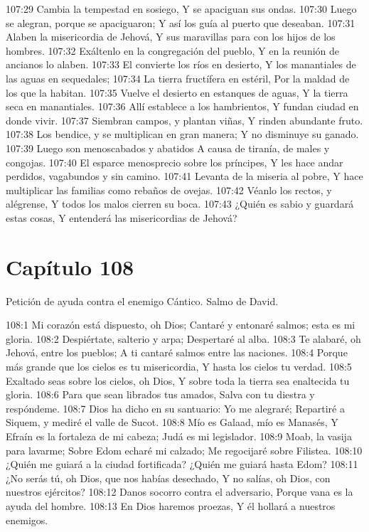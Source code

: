 107:29 Cambia la tempestad en sosiego, 
Y se apaciguan sus ondas. 
107:30 Luego se alegran, porque se apaciguaron; 
Y así los guía al puerto que deseaban. 
107:31 Alaben la misericordia de Jehová, 
Y sus maravillas para con los hijos de los hombres. 
107:32 Exáltenlo en la congregación del pueblo, 
Y en la reunión de ancianos lo alaben. 
107:33 El convierte los ríos en desierto, 
Y los manantiales de las aguas en sequedales; 
107:34 La tierra fructífera en estéril, 
Por la maldad de los que la habitan. 
107:35 Vuelve el desierto en estanques de aguas, 
Y la tierra seca en manantiales. 
107:36 Allí establece a los hambrientos, 
Y fundan ciudad en donde vivir. 
107:37 Siembran campos, y plantan viñas, 
Y rinden abundante fruto. 
107:38 Los bendice, y se multiplican en gran manera; 
Y no disminuye su ganado. 
107:39 Luego son menoscabados y abatidos 
A causa de tiranía, de males y congojas. 
107:40 El esparce menosprecio sobre los príncipes, 
Y les hace andar perdidos, vagabundos y sin camino. 
107:41 Levanta de la miseria al pobre, 
Y hace multiplicar las familias como rebaños de ovejas. 
107:42 Véanlo los rectos, y alégrense, 
Y todos los malos cierren su boca. 
107:43 ¿Quién es sabio y guardará estas cosas, 
Y entenderá las misericordias de Jehová? 
\section*{Capítulo 108}
Petición de ayuda contra el enemigo 
Cántico. Salmo de David. 
 
108:1 Mi corazón está dispuesto, oh Dios; 
Cantaré y entonaré salmos; esta es mi gloria. 
108:2 Despiértate, salterio y arpa; 
Despertaré al alba. 
108:3 Te alabaré, oh Jehová, entre los pueblos; 
A ti cantaré salmos entre las naciones. 
108:4 Porque más grande que los cielos es tu misericordia, 
Y hasta los cielos tu verdad. 
108:5 Exaltado seas sobre los cielos, oh Dios, 
Y sobre toda la tierra sea enaltecida tu gloria. 
108:6 Para que sean librados tus amados, 
Salva con tu diestra y respóndeme. 
108:7 Dios ha dicho en su santuario: Yo me alegraré; 
Repartiré a Siquem, y mediré el valle de Sucot. 
108:8 Mío es Galaad, mío es Manasés, 
Y Efraín es la fortaleza de mi cabeza; 
Judá es mi legislador. 
108:9 Moab, la vasija para lavarme; 
Sobre Edom echaré mi calzado; 
Me regocijaré sobre Filistea. 
108:10 ¿Quién me guiará a la ciudad fortificada? 
¿Quién me guiará hasta Edom? 
108:11 ¿No serás tú, oh Dios, que nos habías desechado, 
Y no salías, oh Dios, con nuestros ejércitos? 
108:12 Danos socorro contra el adversario, 
Porque vana es la ayuda del hombre. 
108:13 En Dios haremos proezas, 
Y él hollará a nuestros enemigos. 
